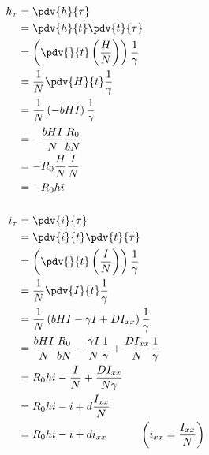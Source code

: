 \documentclass[plain]{pset}
\begin{document}
\begin{solution}
    \begin{align*}
        h_\tau & = \pdv{h}{\tau}                                                                                        \\
               & = \pdv{h}{t}\pdv{t}{\tau}                                                                              \\
               & = \left(\pdv{}{t}\left(\frac{H}{N}\right)\right)\frac{1}{\gamma}                                       \\
               & = \frac{1}{N}\pdv{H}{t}\frac{1}{\gamma}                                                                \\
               & = \frac{1}{N}\left(-bHI\right)\frac{1}{\gamma}                                                         \\
               & = -\frac{bHI}{N}\frac{R_0}{bN}                                                                         \\
               & = -R_0 \frac{H}{N}\frac{I}{N}                                                                          \\
               & = -R_0 hi                                                                                              \\
               &                                                                                                        \\
        i_\tau & = \pdv{i}{\tau}                                                                                        \\
               & = \pdv{i}{t}\pdv{t}{\tau}                                                                              \\
               & = \left(\pdv{}{t}\left(\frac{I}{N}\right)\right)\frac{1}{\gamma}                                       \\
               & = \frac{1}{N}\pdv{I}{t}\frac{1}{\gamma}                                                                \\
               & = \frac{1}{N}\left(bHI - \gamma I + DI_{xx}\right)\frac{1}{\gamma}                                     \\
               & = \frac{bHI}{N}\frac{R_0}{bN} - \frac{\gamma I}{N}\frac{1}{\gamma} + \frac{DI_{xx}}{N}\frac{1}{\gamma} \\
               & = R_0 hi - \frac{I}{N} + \frac{DI_{xx}}{N\gamma}                                                       \\
               & = R_0 hi - i + d\frac{I_{xx}}{N}                                                                       \\
               & = R_0 hi - i + di_{xx} \quad \qquad \left(i_{xx} = \frac{I_{xx}}{N}\right)
    \end{align*}
\end{solution}
\end{document}
